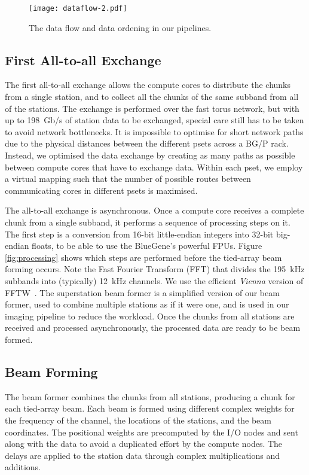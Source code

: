 \documentclass{llncs}
\begin{document}
\begin{figure}[ht]
\center
\texttt{[image: dataflow-2.pdf]}
\caption{The data flow and data ordening in our pipelines.}
\label{fig:dataflow}
\end{figure}

\subsection{First All-to-all Exchange}
\label{Sec:transpose1}

The first all-to-all exchange allows the compute cores to distribute the chunks from a single station, and to collect all the chunks of the same subband from all of the stations. The exchange is performed over the fast torus network, but with up to 198~Gb/s of station data to be exchanged, special care still has to be taken to avoid network bottlenecks. It is impossible to optimise for short network paths due to the physical distances between the different psets across a BG/P rack. Instead, we optimised the data exchange by creating as many paths as possible between compute cores that have to exchange data. Within each pset, we employ a virtual mapping such that the number of possible routes between communicating cores in different psets is maximised.

The all-to-all exchange is asynchronous. Once a compute core receives a complete chunk from a single subband, it performs a sequence of processing steps on it. The first step is a conversion from 16-bit little-endian integers into 32-bit big-endian floats, to be able to use the BlueGene's powerful FPUs. Figure \ref{fig:processing} shows which steps are performed before the tied-array beam forming occurs. Note the Fast Fourier Transform (FFT) that divides the 195~kHz subbands into (typically) 12~kHz channels. We use the efficient \emph{Vienna} version of FFTW~\cite{Lorenz:05}. The superstation beam former is a simplified version of our beam former, used to combine multiple stations as if it were one, and is used in our imaging pipeline to reduce the workload. Once the chunks from all stations are received and processed asynchronously, the processed data are ready to be beam formed.

\subsection{Beam Forming}
\label{Sec:pipeline_beamforming}

The beam former combines the chunks from all stations, producing a chunk for each tied-array beam. Each beam is formed using different complex weights for the frequency of the channel, the locations of the stations, and the beam coordinates. The positional weights are precomputed by the I/O nodes and sent along with the data to avoid a duplicated effort by the compute nodes. The delays are applied to the station data through complex multiplications and additions.
\end{document}

